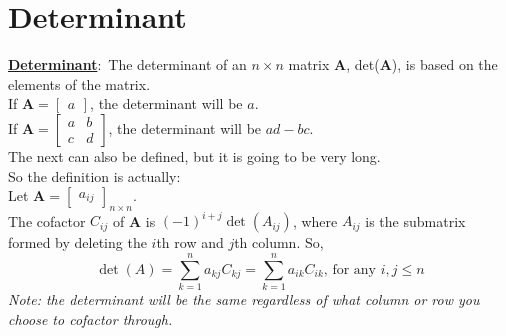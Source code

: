 \documentclass[nobib]{tufte-handout}
\newcommand{\defn}[2]{\underline{\noindent\textbf{#1}}:\ #2}
\begin{document}
\section{Determinant}
\defn{Determinant}{The determinant of an $n \times n$ matrix \textbf{A}, det(\textbf{A}), is based on the elements of the matrix.}\\
If $\mathbf{A}=\begin{bmatrix}a\end{bmatrix}$, the determinant will be $a$.\\
If $\mathbf{A}=\begin{bmatrix}a & b\\ c & d\end{bmatrix}$, the determinant will be $ad-bc$.\\
The next can also be defined, but it is going to be very long. \\
So the definition is actually:\\
Let $\mathbf{A}=\begin{bmatrix}a_{ij}\end{bmatrix}_{n\times n}$. \\
The cofactor $C_{ij}$ of \textbf{A} is $(-1)^{i+j}\det(A_{ij})$, where $A_{ij}$ is the submatrix formed by deleting the $i$th row and $j$th column. So,\\
\begin{equation*}
    \det(A) = \sum_{k=1}^{n}a_{kj}C_{kj} = \sum_{k=1}^{n}a_{ik}C_{ik} \text{, for any } i,j\leq n
\end{equation*}
\textit{Note: the determinant will be the same regardless of what column or row you choose to cofactor through.}\\
\end{document}

